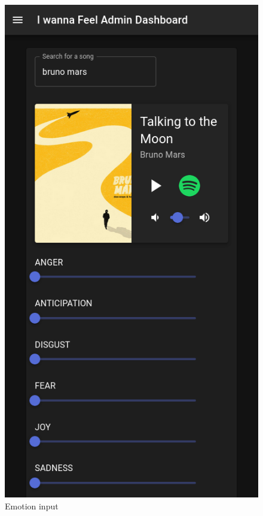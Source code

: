 \begin{figure}[H]
\centering
\includegraphics[scale=0.6]{imgs/mobileui1.png}
\caption{Emotion input}
\label{fig: mobileUI_1}
\end{figure}

